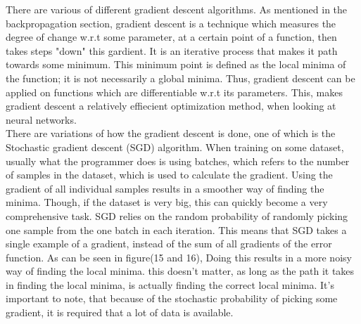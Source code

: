 There are various of different gradient descent algorithms. As mentioned in the backpropagation section, gradient descent is a technique which measures the degree of change w.r.t some parameter, at a certain point of a function, then takes steps "down" this gardient. It is an iterative process that makes it path towards some minimum. This minimum point is defined as the local minima of the function; it is not necessarily a global minima. Thus, gradient descent can be applied on functions which are differentiable w.r.t its parameters. This, makes gradient descent a relatively effiecient optimization method, when looking at neural networks.\\

\noindent
There are variations of how the gradient descent is done, one of which is the Stochastic gradient descent (SGD) algorithm. When training on some dataset, usually what the programmer does is using batches, which refers to the number of samples in the dataset, which is used to calculate the gradient. Using the gradient of all individual samples results in a smoother way of finding the minima. Though, if the dataset is very big, this can quickly become a very comprehensive task. SGD relies on the random probability of randomly picking one sample from the one batch in each iteration. This means that SGD takes a single example of a gradient, instead of the sum of all gradients of the error function. As can be seen in figure(15 and 16), Doing this results in a more noisy way of finding the local minima. this doesn't matter, as long as the path it takes in finding the local minima, is actually finding the correct local minima. It's important to note, that because of the stochastic probability of picking some gradient, it is required that a lot of data is available.




